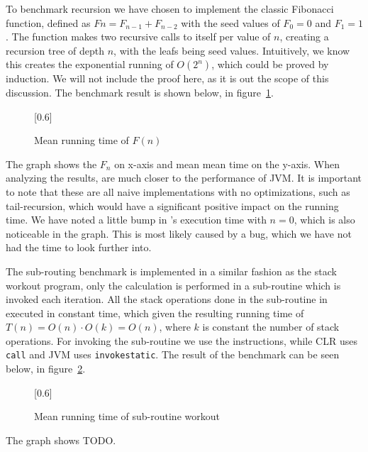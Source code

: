 
To benchmark recursion we have chosen to implement the classic Fibonacci
function, defined as $Fn = F_{n-1} + F_{n-2}$ with the seed values of $F_0 = 0$
and $F_1 = 1$. The function makes two recursive calls to itself per value of
$n$, creating a recursion tree of depth $n$, with the leafs being seed
values. Intuitively, we know this creates the exponential running of $O(2^n)$,
which could be proved by induction. We will not include the proof here, as it is
out the scope of this discussion. The benchmark result is shown below, in
figure~\ref{fig:eval:benchmark:fib}.
\begin{figure}[H]
  \centering
  \scalebox{0.8}[0.6]{}
  \caption{Mean running time of $F(n)$}
\label{fig:eval:benchmark:fib}
\end{figure}

The graph shows the $F_n$ on x-axis and mean mean time on the y-axis. When
analyzing the results, \thename{} are much closer to the performance of JVM. It
is important to note that these are all naive implementations with no
optimizations, such as tail-recursion, which would have a significant positive
impact on the running time. We have noted a little bump in \thename{}'s
execution time with $n = 0$, which is also noticeable in the graph. This is most
likely caused by a bug, which we have not had the time to look further into.


The sub-routing benchmark is implemented in a similar fashion as the stack
workout program, only the calculation is performed in a sub-routine which is
invoked each iteration. All the stack operations done in the sub-routine in
executed in constant time, which given the resulting running time of
$T(n) = O(n) \cdot O(k) = O(n)$, where $k$ is constant the number of stack
operations. For invoking the sub-routine we use the  instructions,
while CLR uses {\tt call} and JVM uses {\tt invokestatic}. The result of the
benchmark can be seen below, in figure~\ref{fig:eval:benchmark:invoc}.
\begin{figure}[H]
  \centering
  \scalebox{0.8}[0.6]{}
  \caption{Mean running time of sub-routine workout}
\label{fig:eval:benchmark:invoc}
\end{figure}

The graph shows TODO.


